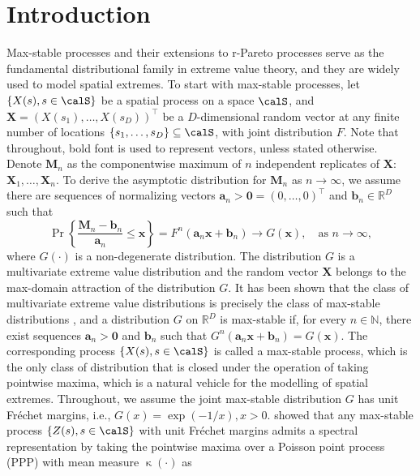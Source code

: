 \documentclass[12pt]{article}
\begin{document}
\section{Introduction}\label{sec:intro}
Max-stable processes and their extensions to r-Pareto processes serve as the fundamental distributional family in extreme value theory, and they are widely used to model spatial extremes. To start with max-stable processes, let $\{X(s),s\in\calS\}$ be a spatial process on a space $\calS$, and $\bm X=(X(s_1),\dots,X(s_D))^\top$ be a $D$-dimensional random vector at any finite number of locations $\{s_1,\dots,s_D\}\subseteq\calS$, with joint distribution $F$. 
Note that throughout, bold font is used to represent vectors, unless stated otherwise.  
Denote $\bm M_n$ as the componentwise maximum of $n$ independent replicates of $\bm X$: $\bm X_1, \dots, \bm X_n$. To derive the asymptotic distribution for $\bm M_n$ as $n\to\infty$, we assume there are sequences of normalizing vectors ${\bm a_n> \bm 0} = (0, \ldots, 0)^\top$ and $\bm b_n \in \mathbb{R}^D$ such that 
\begin{equation}
\label{eq:max-stable}
\Pr\left\{\frac{\bm M_n - \bm b_n  }{\bm a_n} \leq \bm x\right\} = F^n(\bm a_n\bm x + \bm b_n) \to G(\bm x), \quad \mbox{as }n\to \infty,
\end{equation}  
where $G(\cdot)$ is a non-degenerate distribution. The distribution $G$ is a multivariate extreme value distribution and the random vector $\bm X$ belongs to the max-domain attraction of the distribution $G$. It has been shown that the class of multivariate extreme value distributions is precisely the class of max-stable distributions \citep[p. 264]{Resnick1987}, and a distribution $G$ on $\mathbb R^D$ is max-stable if, for every $n\in\mathbb N$, there exist sequences $\bm a_n>\bm 0$ and $\bm b_n$ such that $G^n(\bm a_n\bm x + \bm b_n) =G(\bm x)$. The corresponding process $\{X(s),s\in\calS\}$ is called a max-stable process, which is the only class of distribution that is closed under the operation of taking pointwise maxima,  which is a natural vehicle for the modelling of spatial extremes.
Throughout, we assume the joint max-stable distribution $G$ has unit Fr\'echet margins, i.e., $G(x)=\exp(-1/x), x>0$. \cite{Haan1984} showed that any max-stable process $\{Z(s),s\in\calS\}$ with unit Fr\'echet margins admits a spectral representation by taking the pointwise maxima over a Poisson point process (PPP) with mean measure $\upkappa(\cdot)$ as 
\end{document}
